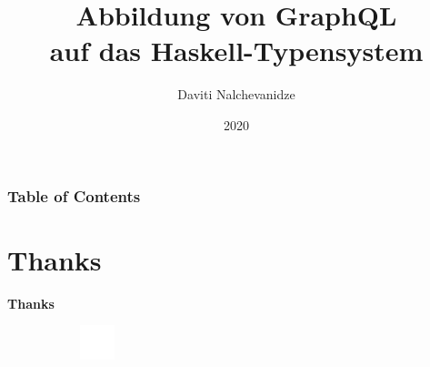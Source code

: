 \documentclass[aspectratio=169,t,xcolor=table]{beamer}
\begin{document}
\title[Inf UFG]{Abbildung von GraphQL \\ auf das Haskell-Typensystem}

\author{Daviti Nalchevanidze}

\date{2020}
\frame[noframenumbering]{\titlepage}



\begin{frame}
    \frametitle{Table of Contents}
    \tableofcontents
\end{frame}






\section{Thanks}
\begin{frame}
    
    \centering
    \vspace{2cm}
    
    \textbf{\Huge Thanks}
    
    
    
    
    \vspace{2cm}
    \begin{figure}
        \centering
        \begin{subfigure}{0.2\textwidth}
            \centering
            \includegraphics[height=1cm]{assets/img/logo-white-outline.pdf}
        \end{subfigure}%
    \end{figure}
\end{frame}


\titlepage
\end{document}
